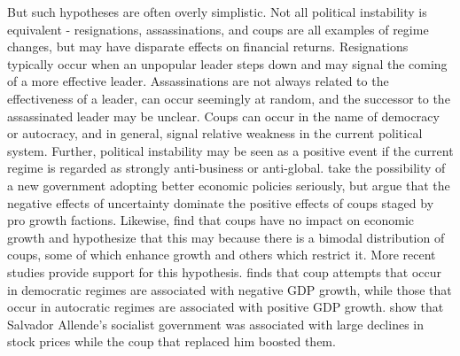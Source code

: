 \documentclass[12pt,final,fleqn]{article}
\theoremstyle{plain}
\begin{document}
But such hypotheses are often overly simplistic. Not all political instability is equivalent - resignations, assassinations, and coups are all examples of regime changes, but may have disparate effects on financial returns. Resignations typically occur when an unpopular leader steps down and may signal the coming of a more effective leader. Assassinations are not always related to the effectiveness of a leader, can occur seemingly at random, and the successor to the assassinated leader may be unclear. Coups can occur in the name of democracy or autocracy, and in general, signal relative weakness in the current political system. Further, political instability may be seen as a positive event if the current regime is regarded as strongly anti-business or anti-global.  \citet{alesina1996political} take the possibility of a new government adopting better economic policies seriously, but argue that the negative effects of uncertainty dominate the positive effects of coups staged by pro growth factions. Likewise, \citet{londregan1990poverty} find that coups have no impact on economic growth and hypothesize that this may because there is a bimodal distribution of coups, some of which enhance growth and others which restrict it. More recent studies provide support for this hypothesis. \citet{meyersson2016political} finds that coup attempts that occur in democratic regimes are associated with negative GDP growth, while those that occur in autocratic regimes are associated with positive GDP growth. \citet{girardi2018institution} show that Salvador Allende's socialist government was associated with large declines in stock prices while the coup that replaced him boosted them.  
\end{document}
